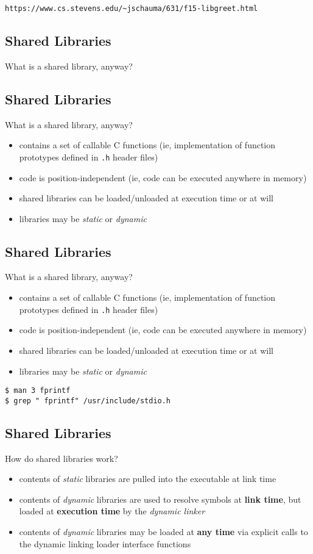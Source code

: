 \documentclass[xga]{xdvislides}
\begin{document}
\vspace{1in}
\verb+https://www.cs.stevens.edu/~jschauma/631/f15-libgreet.html+

\subsection{Shared Libraries}
What is a shared library, anyway?

\subsection{Shared Libraries}
What is a shared library, anyway?
\begin{itemize}
	\item contains a set of callable C functions (ie, implementation
		of function prototypes defined in {\tt .h} header files)
	\item code is position-independent (ie, code can be executed anywhere
		in memory)
	\item shared libraries can be loaded/unloaded at execution time or at will
	\item libraries may be {\em static} or {\em dynamic}
\end{itemize}

\subsection{Shared Libraries}
What is a shared library, anyway?
\begin{itemize}
	\item contains a set of callable C functions (ie, implementation
		of function prototypes defined in {\tt .h} header files)
	\item code is position-independent (ie, code can be executed anywhere
		in memory)
	\item shared libraries can be loaded/unloaded at execution time or at will
	\item libraries may be {\em static} or {\em dynamic}
\end{itemize}
\begin{verbatim}
$ man 3 fprintf
$ grep " fprintf" /usr/include/stdio.h
\end{verbatim}


\subsection{Shared Libraries}
How do shared libraries work?
\begin{itemize}
	\item contents of {\em static} libraries are pulled into the
		executable at link time
	\item contents of {\em dynamic} libraries are used to resolve
		symbols at {\bf link time}, but loaded at {\bf execution time} by the
		{\em dynamic linker}
	\item contents of {\em dynamic} libraries may be loaded at {\bf any
		time} via explicit calls to the dynamic linking loader interface
		functions
\end{itemize}
\end{document}

